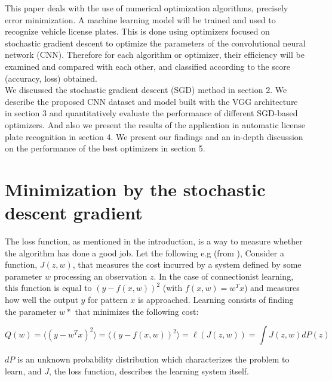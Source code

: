 \documentclass[lnbip]{svmultln}
\begin{document}
	This paper deals with the use of numerical optimization algorithms, precisely error minimization. %
	A machine learning model will be trained and used to recognize vehicle license plates. 
	This is done using optimizers focused on stochastic gradient descent to optimize the parameters of the convolutional neural network (CNN).
	Therefore for each algorithm or optimizer, their efficiency will be examined and compared with each other, and classified according to the score (accuracy, loss) obtained.\\
	
	We discussed the stochastic gradient descent (SGD) method in section 2. We describe the proposed CNN dataset and model built with the VGG architecture in section 3 and quantitatively evaluate the performance of different SGD-based optimizers. And also we present the results of the application in automatic license plate recognition in section 4. We present our findings and an in-depth discussion on the performance of the best optimizers in section 5.
	

\section{Minimization by the stochastic descent gradient}
	The loss function, as mentioned in the introduction, is a way to measure whether the algorithm has done a good job.  
	Let the following e.g (from \cite[]{bottou1991stochastic}), Consider a function, $J(z,w)$, that measures the cost incurred by a system defined by some parameter $w$ processing an observation $z$. In the case of connectionist learning, this function is equal to $(y-f(x,w))^2$ (with $f(x,w) = w^Tx$) and measures how well the output $y$ for pattern $x$ is approached. Learning consists of finding the parameter $w*$ that minimizes the following cost:
	
	\begin{equation}
		Q(w) =\langle (y-w^Tx)^2 \rangle = \langle (y-f(x,w))^2 \rangle = \ell(J(z,w)) = \int J(z,w)dP(z)
		\label{eq:cost}
	\end{equation}
	
	$dP$ is an unknown probability distribution which characterizes the problem to learn, and $J$, the loss function, describes the learning system itself.\\
	
\end{document}
